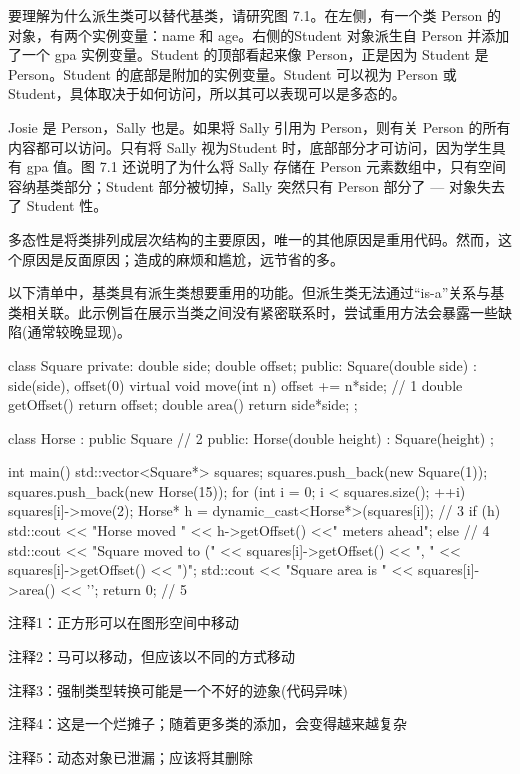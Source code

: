 
要理解为什么派生类可以替代基类，请研究图 7.1。在左侧，有一个类 Person 的对象，有两个实例变量：name 和 age。右侧的Student 对象派生自 Person 并添加了一个 gpa 实例变量。Student 的顶部看起来像 Person，正是因为 Student 是 Person。Student 的底部是附加的实例变量。Student 可以视为 Person 或Student，具体取决于如何访问，所以其可以表现可以是多态的。

Josie 是 Person，Sally 也是。如果将 Sally 引用为 Person，则有关 Person 的所有内容都可以访问。只有将 Sally 视为Student 时，底部部分才可访问，因为学生具有 gpa 值。图 7.1 还说明了为什么将 Sally 存储在 Person 元素数组中，只有空间容纳基类部分；Student 部分被切掉，Sally 突然只有 Person 部分了 — 对象失去了 Student 性。


多态性是将类排列成层次结构的主要原因，唯一的其他原因是重用代码。然而，这个原因是反面原因；造成的麻烦和尴尬，远节省的多。

以下清单中，基类具有派生类想要重用的功能。但派生类无法通过“is-a”关系与基类相关联。此示例旨在展示当类之间没有紧密联系时，尝试重用方法会暴露一些缺陷(通常较晚显现)。


\begin{cpp}
class Square {
private:
  double side;
  double offset;
public:
  Square(double side) : side(side), offset(0) {}
  virtual void move(int n) { offset += n*side; } // 1
  double getOffset() { return offset; }
  double area() { return side*side; }
};

class Horse : public Square { // 2
public:
  Horse(double height) : Square(height) {}
};

int main() {
  std::vector<Square*> squares;
  squares.push_back(new Square(1));
  squares.push_back(new Horse(15));
  for (int i = 0; i < squares.size(); ++i) {
    squares[i]->move(2);
    Horse* h = dynamic_cast<Horse*>(squares[i]); // 3
    if (h) {
      std::cout << "Horse moved " << h->getOffset()
        <<" meters ahead\n";
    } else { // 4
      std::cout << "Square moved to (" << squares[i]->getOffset()
        << ", " << squares[i]->getOffset() << ")\n";
      std::cout << "Square area is " << squares[i]->area() << '\n';
    }
  }
  return 0; // 5
}
\end{cpp}

{\footnotesize
注释1：正方形可以在图形空间中移动

注释2：马可以移动，但应该以不同的方式移动

注释3：强制类型转换可能是一个不好的迹象(代码异味)

注释4：这是一个烂摊子；随着更多类的添加，会变得越来越复杂

注释5：动态对象已泄漏；应该将其删除
}

